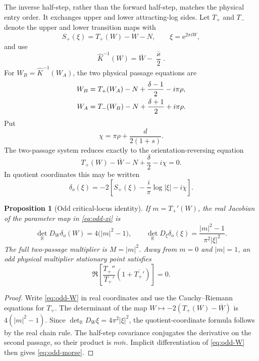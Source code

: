 \documentclass[11pt]{article}
\newtheorem{proposition}[theorem]{Proposition}
\theoremstyle{definition}
\theoremstyle{remark}
\newcommand{\R}{\mathbb R}
\newcommand{\e}{\mathrm e}
\begin{document}
The inverse half-step, rather than the forward half-step, matches the physical entry order.  It exchanges upper and lower attracting-log sides.  Let $T_+$ and $T_-$ denote the upper and lower transition maps with
\begin{equation}
  S_+(\xi)=T_+(W)-W-N,
  \qquad \xi=\e^{2\pi iW},
  \label{eq:S-plus}
\end{equation}
and use
\begin{equation}
  \widehat K^{-1}(W)=\bar W-\frac{\bar\varkappa}{2}.
  \label{eq:inverse-halfstep}
\end{equation}
For $W_B=\widehat K^{-1}(W_A)$, the two physical passage equations are
\begin{align}
  W_B&=T_+(W_A)-N+\frac{\delta-1}{2}-i\pi\rho,\notag\\
  W_A&=T_-(W_B)-N+\frac{\delta+1}{2}+i\pi\rho.
  \label{eq:odd-two-passage}
\end{align}
Put
\begin{equation}
  \chi=\pi\rho+\frac{d}{2(1+s)}.
  \label{eq:chi}
\end{equation}
The two-passage system reduces exactly to the orientation-reversing equation
\begin{equation}
  T_+(W)-\bar W-N+\frac\delta2-i\chi=0.
  \label{eq:odd-W}
\end{equation}
In quotient coordinates this may be written
\begin{equation}
  \delta_o(\xi)=-2\left[S_+(\xi)-\frac{i}{\pi}\log|\xi|-i\chi\right].
  \label{eq:odd-xi}
\end{equation}

\begin{proposition}[Odd critical-locus identity]\label{prop:odd-fold}
If $m=T_+'(W)$, the real Jacobian of the parameter map in \cref{eq:odd-xi} is
\begin{equation}
  \det_{\R}D_W\delta_o(W)=4\bigl(|m|^2-1\bigr),
  \qquad
  \det_{\R}D_\xi\delta_o(\xi)
  =\frac{|m|^2-1}{\pi^2|\xi|^2}.
  \label{eq:odd-jacobian}
\end{equation}
The full two-passage multiplier is $M=|m|^2$.  Away from $m=0$ and $|m|=1$, an odd physical multiplier stationary point satisfies
\begin{equation}
  \Re\left[\frac{T_+''}{T_+'}(1+\overline{T_+'})\right]=0.
  \label{eq:odd-morse}
\end{equation}
\end{proposition}

\begin{proof}
Write \cref{eq:odd-W} in real coordinates and use the Cauchy--Riemann equations for $T_+$.  The determinant of the map $W\mapsto-2(T_+(W)-\bar W)$ is $4(|m|^2-1)$.  Since $\det_{\R}D_W\xi=4\pi^2|\xi|^2$, the quotient-coordinate formula follows by the real chain rule.  The half-step covariance conjugates the derivative on the second passage, so their product is $m\bar m$.  Implicit differentiation of \cref{eq:odd-W} then gives \cref{eq:odd-morse}.
\end{proof}
\end{document}
